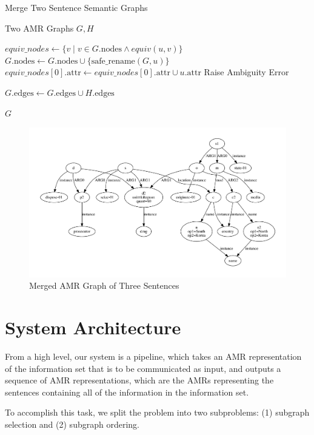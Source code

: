 \documentclass[12pt]{article}
\begin{document}
\begin{algorithm}
\caption{Merge Two Sentence Semantic Graphs}
\label{alg:merge_graphs}
\begin{algorithmic}[1]
\REQUIRE Two AMR Graphs $G, H$

    \STATE $equiv\_nodes \gets \{v \mid v \in G.\text{nodes} \land equiv(u,v)\}$
        \STATE $G.\text{nodes} \gets G.\text{nodes} \cup \{\text{safe\_rename}(G, u)\}$
        \STATE $equiv\_nodes[0].\text{attr} \gets equiv\_nodes[0].\text{attr} \cup u.\text{attr}$
    \ELSE
        \STATE Raise Ambiguity Error
    \ENDIF
\ENDFOR

\STATE $G.\text{edges} \gets G.\text{edges} \cup H.\text{edges}$

\RETURN $G$
\end{algorithmic}
\end{algorithm}

\begin{figure}
\includegraphics[width=\linewidth]{amr_example_3_merged.pdf}
\caption{Merged AMR Graph of Three Sentences}
\label{fig:amr_example_3_merged}
\end{figure}

\section{System Architecture}

From a high level, our system is a pipeline, which takes an AMR representation
of the information set that is to be communicated as input, and outputs a
sequence of AMR representations, which are the AMRs representing the sentences
containing all of the information in the information set.

To accomplish this task, we split the problem into two subproblems: (1)
subgraph selection and (2) subgraph ordering.
\end{document}
